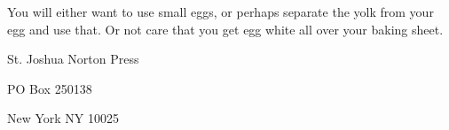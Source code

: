 \documentclass[12pt]{article}
\begin{document}
You will either want to use small eggs, or perhaps separate the yolk from your egg and 
use that. Or not care that you get egg white all over your baking sheet.


\newpage

\thispagestyle{empty}
\vspace*{12cm}
\begin{sideways}
\Large{St. Joshua Norton Press}
\end{sideways}
\begin{sideways}
\Large{PO Box 250138}
\end{sideways}
\begin{sideways}
\Large{New York NY 10025}
\end{sideways}
\end{document}
